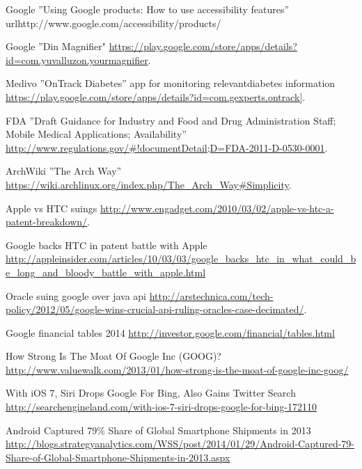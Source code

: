 \documentclass[conference]{IEEEtran}
\begin{document}
\begin{thebibliography}{1}
Google ''Using Google products: How to use accessibility features'' url{http://www.google.com/accessibility/products/}

Google ''Din Magnifier" \url{https://play.google.com/store/apps/details?id=com.yuvalluzon.yourmagnifier}.

Medivo ''OnTrack Diabetes'' app for monitoring relevantdiabetes information
\url{https://play.google.com/store/apps/details?id=com.gexperts.ontrack]}.

FDA ''Draft Guidance for Industry and Food and Drug Administration Staff; Mobile Medical Applications; Availability''
\url{http://www.regulations.gov/#!documentDetail;D=FDA-2011-D-0530-0001}.

ArchWiki ''The Arch Way'' \url{https://wiki.archlinux.org/index.php/The\_Arch\_Way#Simplicity}.

Apple vs HTC suings
\url{http://www.engadget.com/2010/03/02/apple-vs-htc-a-patent-breakdown/}.

Google backs HTC in patent battle with Apple
\url{http://appleinsider.com/articles/10/03/03/google_backs_htc_in_what_could_be_long_and_bloody_battle_with_apple.html}

Oracle suing google over java api
\url{http://arstechnica.com/tech-policy/2012/05/google-wins-crucial-api-ruling-oracles-case-decimated/}.

Google financial tables 2014
\url{http://investor.google.com/financial/tables.html}

How Strong Is The Moat Of Google Inc (GOOG)?
\url{http://www.valuewalk.com/2013/01/how-strong-is-the-moat-of-google-inc-goog/}

With iOS 7, Siri Drops Google For Bing, Also Gains Twitter Search
\url{http://searchengineland.com/with-ios-7-siri-drops-google-for-bing-172110}

Android Captured 79\% Share of Global Smartphone Shipments in 2013
\url{http://blogs.strategyanalytics.com/WSS/post/2014/01/29/Android-Captured-79-Share-of-Global-Smartphone-Shipments-in-2013.aspx}



\end{thebibliography}
\end{document}
